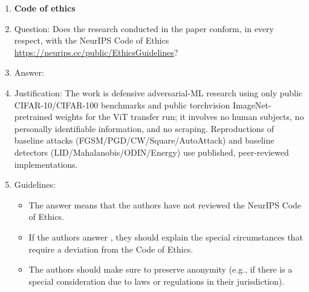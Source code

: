 \begin{enumerate}
\item {\bf Code of ethics}
    \item[] Question: Does the research conducted in the paper conform, in every respect, with the NeurIPS Code of Ethics \url{https://neurips.cc/public/EthicsGuidelines}?
    \item[] Answer: \answerYes{}
    \item[] Justification: The work is defensive adversarial-ML research using only public CIFAR-10/CIFAR-100 benchmarks and public torchvision ImageNet-pretrained weights for the ViT transfer run; it involves no human subjects, no personally identifiable information, and no scraping. Reproductions of baseline attacks (FGSM/PGD/CW/Square/AutoAttack) and baseline detectors (LID/Mahalanobis/ODIN/Energy) use published, peer-reviewed implementations.
    \item[] Guidelines:
    \begin{itemize}
        \item The answer \answerNA{} means that the authors have not reviewed the NeurIPS Code of Ethics.
        \item If the authors answer \answerNo, they should explain the special circumstances that require a deviation from the Code of Ethics.
        \item The authors should make sure to preserve anonymity (e.g., if there is a special consideration due to laws or regulations in their jurisdiction).
    \end{itemize}



\end{enumerate}
